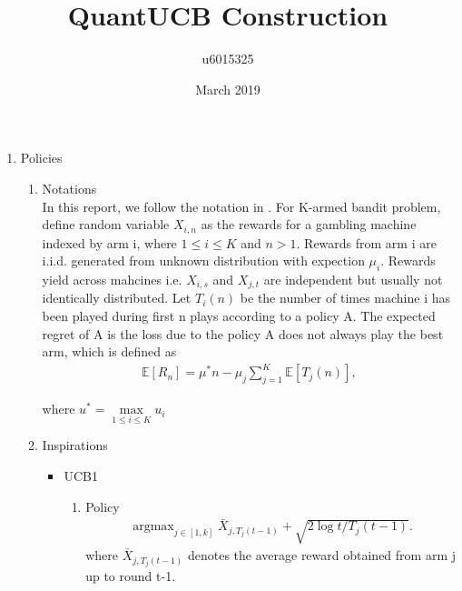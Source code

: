 \documentclass{article}
\title{QuantUCB Construction}
\author{u6015325 }
\date{March 2019}
\DeclareMathOperator*{\argmax}{argmax}
\begin{document}
\maketitle

\begin{enumerate}
\item Policies 

    \begin{enumerate}
    \item Notations\\
    In this report, we follow the notation in \cite{auer2002finite}. For K-armed bandit problem, define random variable $X_{i,n}$ as the rewards for a gambling machine indexed by arm i, where $1 \leq i \leq K$ and $n > 1$. Rewards from arm i are i.i.d. generated from unknown distribution with expection $\mu_i$. Rewards yield across mahcines i.e. $X_{i, s}$ and $X_{j, t}$ are independent but usually not identically distributed. 
    Let $T_i(n)$ be the number of times machine i has been played during first n plays according to a policy A. The expected regret of A is the loss due to the policy A does not always play the best arm, which is defined as 
    \begin{align}
        \label{regret}
        \mathbb{E}[R_n] = \mu^\ast n - \mu_j \sum_{j=1}^K \mathbb{E}[T_j(n)],
    \end{align}

    where $u^\ast = \mathop{max}\limits_{1 \leq i \leq K} u_i$
    \item Inspirations\\
    \begin{itemize}
        \item UCB1\\
            \begin{enumerate}
                \item Policy\\
                    \begin{align}
                    \argmax_{j \in [1,k]} \bar{X}_{j,T_j(t-1)} + \sqrt{2 \log t/ T_j(t-1)}.
                    \end{align}
                where $\bar{X}_{j, T_j(t-1)}$ denotes the average reward obtained from arm j up to round t-1.
                

\end{enumerate}
\end{itemize}
\end{enumerate}
\end{enumerate}
\end{document}
